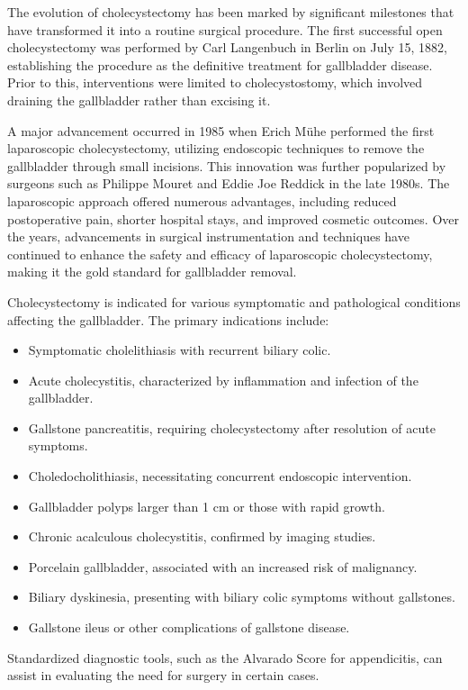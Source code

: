 The evolution of cholecystectomy has been marked by significant milestones that have transformed it into a routine surgical procedure. The first successful open cholecystectomy was performed by Carl Langenbuch in Berlin on July 15, 1882, establishing the procedure as the definitive treatment for gallbladder disease. Prior to this, interventions were limited to cholecystostomy, which involved draining the gallbladder rather than excising it.

A major advancement occurred in 1985 when Erich M\"{u}he performed the first laparoscopic cholecystectomy, utilizing endoscopic techniques to remove the gallbladder through small incisions. This innovation was further popularized by surgeons such as Philippe Mouret and Eddie Joe Reddick in the late 1980s. The laparoscopic approach offered numerous advantages, including reduced postoperative pain, shorter hospital stays, and improved cosmetic outcomes. Over the years, advancements in surgical instrumentation and techniques have continued to enhance the safety and efficacy of laparoscopic cholecystectomy, making it the gold standard for gallbladder removal.

Cholecystectomy is indicated for various symptomatic and pathological conditions affecting the gallbladder. The primary indications include:

\begin{itemize}
  \item Symptomatic cholelithiasis with recurrent biliary colic.
  \item Acute cholecystitis, characterized by inflammation and infection of the gallbladder.
  \item Gallstone pancreatitis, requiring cholecystectomy after resolution of acute symptoms.
  \item Choledocholithiasis, necessitating concurrent endoscopic intervention.
  \item Gallbladder polyps larger than 1 cm or those with rapid growth.
  \item Chronic acalculous cholecystitis, confirmed by imaging studies.
  \item Porcelain gallbladder, associated with an increased risk of malignancy.
  \item Biliary dyskinesia, presenting with biliary colic symptoms without gallstones.
  \item Gallstone ileus or other complications of gallstone disease.
\end{itemize}

Standardized diagnostic tools, such as the Alvarado Score for appendicitis, can assist in evaluating the need for surgery in certain cases.

